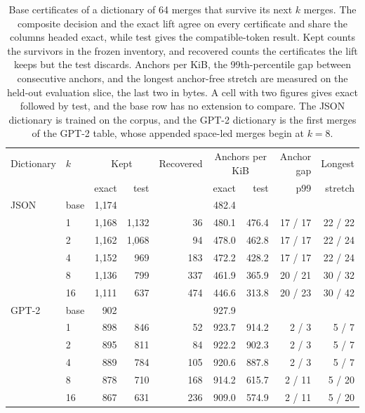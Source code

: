 \documentclass[11pt,a4paper]{article}
\theoremstyle{definition}
\theoremstyle{plain}
\begin{document}
\begin{table}[tp]
\centering
\small
\begin{tabular}{llrrrrrrr}
\toprule
Dictionary & $k$ & \multicolumn{2}{c}{Kept} & Recovered & \multicolumn{2}{c}{Anchors per KiB} & Anchor gap &
Longest \\
\cmidrule(lr){3-4} \cmidrule(lr){6-7}
  & & exact & test & & exact & test & p99 & stretch \\
\midrule
JSON & base & 1{,}174 & & & 482.4 & & & \\
 & 1 & 1{,}168 & 1{,}132 & 36 & 480.1 & 476.4 & 17 / 17 & 22 / 22 \\
 & 2 & 1{,}162 & 1{,}068 & 94 & 478.0 & 462.8 & 17 / 17 & 22 / 24 \\
 & 4 & 1{,}152 & 969 & 183 & 472.2 & 428.2 & 17 / 17 & 22 / 24 \\
 & 8 & 1{,}136 & 799 & 337 & 461.9 & 365.9 & 20 / 21 & 30 / 32 \\
 & 16 & 1{,}111 & 637 & 474 & 446.6 & 313.8 & 20 / 23 & 30 / 42 \\
\addlinespace
GPT-2 & base & 902 & & & 927.9 & & & \\
 & 1 & 898 & 846 & 52 & 923.7 & 914.2 & 2 / 3 & 5 / 7 \\
 & 2 & 895 & 811 & 84 & 922.2 & 902.3 & 2 / 3 & 5 / 7 \\
 & 4 & 889 & 784 & 105 & 920.6 & 887.8 & 2 / 3 & 5 / 7 \\
 & 8 & 878 & 710 & 168 & 914.2 & 615.7 & 2 / 11 & 5 / 20 \\
 & 16 & 867 & 631 & 236 & 909.0 & 574.9 & 2 / 11 & 5 / 20 \\
\bottomrule
\end{tabular}
\caption{Base certificates of a dictionary of 64 merges that survive its next $k$ merges. The composite decision and the
exact lift agree on every certificate and share the columns headed exact, while test gives the compatible-token result.
Kept counts the survivors in the frozen inventory, and recovered counts the certificates the lift keeps but the test
discards. Anchors per KiB, the 99th-percentile gap between consecutive anchors, and the longest anchor-free stretch are
measured on the held-out evaluation slice, the last two in bytes. A cell with two figures gives exact followed by test,
and the base row has no extension to compare. The JSON dictionary is trained on the corpus, and the GPT-2 dictionary is
the first merges of the GPT-2 table, whose appended space-led merges begin at $k = 8$.}
\label{tab:transfer}
\end{table}
\end{document}

